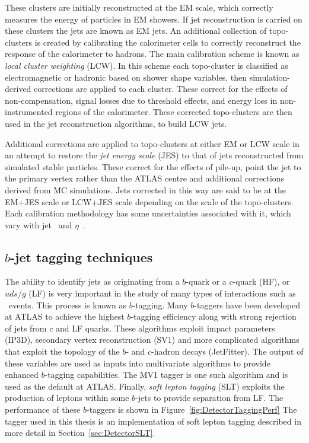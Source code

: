 These clusters are initially reconstructed at the EM scale, which correctly measures the energy of particles in EM showers. If jet reconstruction is carried on these clusters the jets are known as EM jets. An additional collection of topo-clusters is created by calibrating the calorimeter cells to correctly reconstruct the response of the calorimeter to hadrons. The main calibration scheme is known as \emph{local cluster weighting} (LCW). In this scheme each topo-cluster is classified as electromagnetic or hadronic based on shower shape variables, then simulation-derived corrections are applied to each cluster. These correct for the effects of non-compensation, signal losses due to threshold effects, and energy loss in non-instrumented regions of the calorimeter. These corrected topo-clusters are then used in the jet reconstruction algorithms, to build LCW jets. 

Additional corrections are applied to topo-clusters at either EM or LCW scale in an attempt to restore the \emph{jet energy scale} (JES) to that of jets reconstructed from simulated stable particles. These correct for the effects of pile-up, point the jet to the primary vertex rather than the ATLAS centre and additional corrections derived from MC simulations. Jets corrected in this way are said to be at the EM+JES scale or LCW+JES scale depending on the scale of the topo-clusters. Each calibration methodology has some uncertainties associated with it, which vary with jet \pt\ and $\eta$~\cite{Detector:JESPaper}.

\subsection{\texorpdfstring{$b$}{b}-jet tagging techniques}

The ability to identify jets as originating from a $b$-quark or a $c$-quark (HF), or $uds$/$g$ (LF) is very important in the study of many types of interactions such as \ttbar\ events. This process is known as $b$-tagging. Many $b$-taggers have been developed at ATLAS to achieve the highest $b$-tagging efficiency along with strong rejection of jets from $c$ and LF quarks. These algorithms exploit impact parameters (IP3D), secondary vertex reconstruction (SV1) and more complicated algorithms that exploit the topology of the $b$- and $c$-hadron decays (JetFitter). The output of these variables are used as inputs into multivariate algorithms to provide enhanced $b$-tagging capabilities. The MV1 tagger is one such algorithm and is used as the default at ATLAS. Finally, \emph{soft lepton tagging} (SLT) exploits the production of leptons within some $b$-jets to provide separation from LF. The performance of these $b$-taggers is shown in Figure~\ref{fig:DetectorTaggingPerf} The tagger used in this thesis is an implementation of soft lepton tagging described in more detail in Section~\ref{sec:DetectorSLT}.

